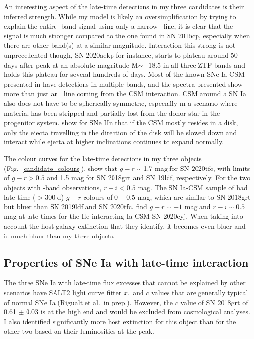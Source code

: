 \documentclass[a4paper,oneside,12pt, class=Latex/Classes/PhDthesisPSnPDF, crop=false]{standalone}
\begin{document}
An interesting aspect of the late-time detections in my three candidates is their inferred strength. While my model is likely an oversimplification by trying to explain the entire \ztfr-band signal using only a narrow \Halpha~line, it is clear that the signal is much stronger compared to the one found in SN 2015cp, especially when there are other band(s) at a similar magnitude. Interaction this strong is not unprecedented though, SN 2020aekp for instance, starts to plateau around 50 days after peak at an absolute magnitude M$\sim-18.5$ in all three ZTF bands \citep{Ia-CSM_BTS} and holds this plateau for several hundreds of days. Most of the known SNe Ia-CSM presented in \citet{Ia-CSM_BTS} have detections in multiple bands, and the spectra presented show more than just an \Halpha~line coming from the CSM interaction. CSM around a SN Ia also does not have to be spherically symmetric, especially in a scenario where material has been stripped and partially lost from the donor star in the progenitor system. \citet{IIn_asym_CSM} show for SNe IIn that if the CSM mostly resides in a disk, only the ejecta travelling in the direction of the disk will be slowed down and interact while ejecta at higher inclinations continues to expand normally. 

The colour curves for the late-time detections in my three objects (Fig.~\ref{candidate_colours}), show that $g - r \sim$1.7 mag for SN 2020tfc, with limits of $g - r > 0.5$ and 1.5 mag for SN 2018grt and SN 19ldf, respectively.
For the two objects with \ztfi-band observations, $r-i<0.5$ mag. The SN Ia-CSM sample of \cite{Ia-CSM_BTS} had late-time ($>$300 d) $g - r$ colours of $0 - 0.5$ mag, which are similar to SN 2018grt but bluer than SN 2019ldf and SN 2020tfc. \citet{Kool_He_CSM} find $g-r\sim-1$ mag and $r-i\sim0.5$ mag at late times for the He-interacting Ia-CSM SN 2020eyj. When taking into account the host galaxy extinction that they identify, it becomes even bluer and is much bluer than my three objects.


\subsection{Properties of SNe Ia with late-time interaction}
\label{discuss_prop}
The three SNe Ia with late-time flux excesses that cannot be explained by other scenarios have SALT2 light curve fitter $x_1$ and $c$ values that are generally typical of normal SNe Ia (Rigualt et al.~in prep.). However, the $c$ value of SN 2018grt of 0.61 $\pm$ 0.03 is at the high end and would be excluded from cosmological analyses. I also identified significantly more host extinction for this object than for the other two based on their luminosities at the peak. 
\end{document}
